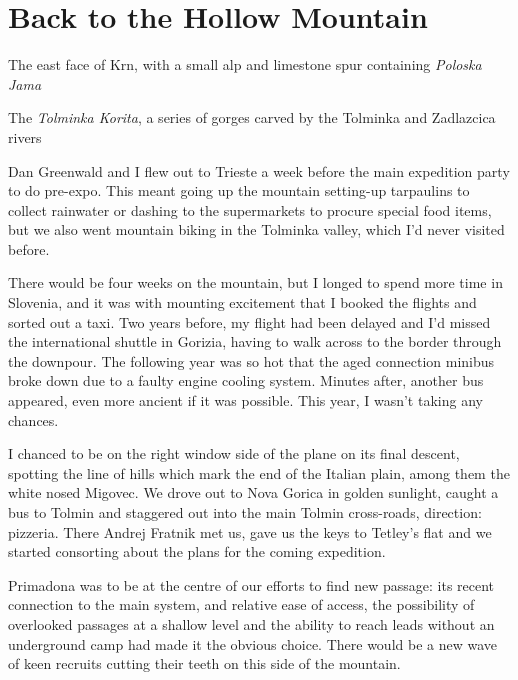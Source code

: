 \section{Back to the Hollow Mountain}
     \begin{marginfigure}
        \centering
        \caption{The east face of Krn, with a small alp and limestone spur containing \emph{Poloska Jama}} \label{Krn}
    \end{marginfigure}
    \begin{marginfigure}
        \centering
        \caption{ The \emph{Tolminka Korita}, a series of gorges carved by the Tolminka and Zadlazcica rivers } \label{Tolminka Gorge}
    \end{marginfigure}
Dan Greenwald and I flew out to Trieste a week before the main expedition party to do pre-expo. This meant going up the mountain setting-up tarpaulins to collect rainwater or dashing to the supermarkets to procure special food items, but we also went mountain biking in the Tolminka valley, which I'd never visited before.

 There would be four weeks on the mountain, but I longed to spend more time in Slovenia, and it was with mounting excitement that I booked the flights and sorted out a taxi. Two years before, my flight had been delayed and I'd missed the international shuttle in Gorizia, having to walk across to the border through the downpour. The following year was so hot that the aged connection minibus broke down due to a faulty engine cooling system. Minutes after, another bus appeared, even more ancient if it was possible. This year, I wasn't taking any chances.

I chanced to be on the right window side of the plane on its final descent, spotting the line of hills which mark the end of the Italian plain, among them the white nosed Migovec. We drove out to Nova Gorica in golden sunlight, caught a bus to Tolmin and staggered out into the main Tolmin cross-roads, direction: pizzeria. There Andrej Fratnik met us, gave us the keys to Tetley's flat and we started consorting about the plans for the coming expedition. 

Primadona was to be at the centre of our efforts to find new passage: its recent connection to the main system, and relative ease of access, the possibility of overlooked passages at a shallow level and the ability to reach leads without an underground camp had made it the obvious choice. There would be a new wave of keen recruits cutting their teeth on this side of the mountain. 

